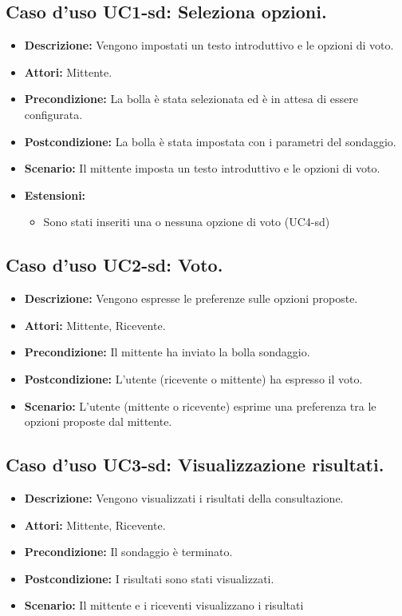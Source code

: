 \subsection{Caso d'uso UC1-sd: Seleziona opzioni.}
\begin{itemize}
\item[]\textbf{Descrizione:} Vengono impostati un testo introduttivo e le opzioni di voto.
\item[]\textbf{Attori:} Mittente. 
\item[]\textbf{Precondizione:} La bolla è stata selezionata ed è in attesa di essere configurata. 
\item[]\textbf{Postcondizione:} La bolla è stata impostata con i parametri del sondaggio. 
\item[]\textbf{Scenario:}
Il mittente imposta un testo introduttivo e le opzioni di voto. 
\item[]\textbf{Estensioni:}
\begin{itemize}
\item Sono stati inseriti una o nessuna opzione di voto (UC4-sd)
\end{itemize} 
\end{itemize}

\subsection{Caso d'uso UC2-sd: Voto.}
\begin{itemize}
\item[]\textbf{Descrizione:} Vengono espresse le preferenze sulle opzioni proposte.
\item[]\textbf{Attori:} Mittente, Ricevente. 
\item[]\textbf{Precondizione:} Il mittente ha inviato la bolla sondaggio. 
\item[]\textbf{Postcondizione:} L'utente (ricevente o mittente) ha espresso il voto. 
\item[]\textbf{Scenario:}
L'utente (mittente o ricevente) esprime una preferenza tra le opzioni proposte dal mittente. 
\end{itemize}

\subsection{Caso d'uso UC3-sd: Visualizzazione risultati.}
\begin{itemize}
\item[]\textbf{Descrizione:} Vengono visualizzati i risultati della consultazione.
\item[]\textbf{Attori:} Mittente, Ricevente. 
\item[]\textbf{Precondizione:} Il sondaggio è terminato. 
\item[]\textbf{Postcondizione:} I risultati sono stati visualizzati. 
\item[]\textbf{Scenario:}
Il mittente e i riceventi visualizzano i risultati 
\end{itemize}

